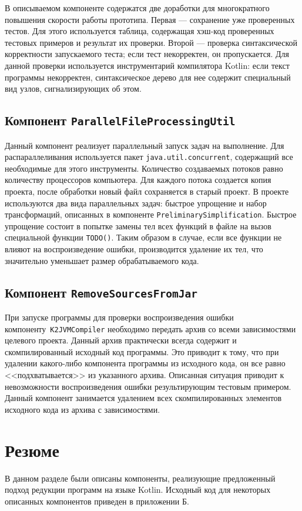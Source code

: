 В описываемом компоненте содержатся две доработки для многократного повышения скорости работы прототипа. Первая --- сохранение уже проверенных тестов. Для этого используется таблица, содержащая хэш-код проверенных тестовых примеров и результат их проверки. Второй --- проверка синтаксической корректности запускаемого теста; если тест некорректен, он пропускается. Для данной проверки используется инструментарий компилятора Kotlin: если текст программы некорректен, синтаксическое дерево для нее содержит специальный вид узлов, сигнализирующих об этом. 

\subsection{Компонент \texttt{ParallelFileProcessingUtil}}
Данный компонент реализует параллельный запуск задач на выполнение. Для распараллеливания используется пакет \texttt{java.util.concurrent}, содержащий все необходимые для этого инструменты. Количество создаваемых потоков равно количеству процессоров компьютера. Для каждого потока создается копия проекта, после обработки новый файл сохраняется в старый проект. В проекте используются два вида параллельных задач: быстрое упрощение и набор трансформаций, описанных в компоненте \texttt{PreliminarySimplification}. Быстрое упрощение состоит в попытке замены тел всех функций в файле на вызов специальной функции \texttt{TODO()}. Таким образом в случае, если все функции не влияют на воспроизведение ошибки, производится удаление их тел, что значительно уменьшает размер обрабатываемого кода. 

\subsection{Компонент \texttt{RemoveSourcesFromJar}}
При запуске программы для проверки воспроизведения ошибки компоненту~\texttt{K2JVMCompiler} необходимо передать архив со всеми зависимостями целевого проекта. Данный архив практически всегда содержит и скомпилированный исходный код программы. Это приводит к тому, что при удалении какого-либо компонента программы из исходного кода, он все равно <<подхватывается>> из указанного архива. Описанная ситуация приводит к невозможности воспроизведения ошибки результирующим тестовым примером. Данный компонент занимается удалением всех скомпилированных элементов исходного кода из архива с зависимостями.

\section{Резюме}
В данном разделе были описаны компоненты, реализующие предложенный подход редукции программ на языке Kotlin. Исходный код для некоторых описанных компонентов приведен в приложении Б.
